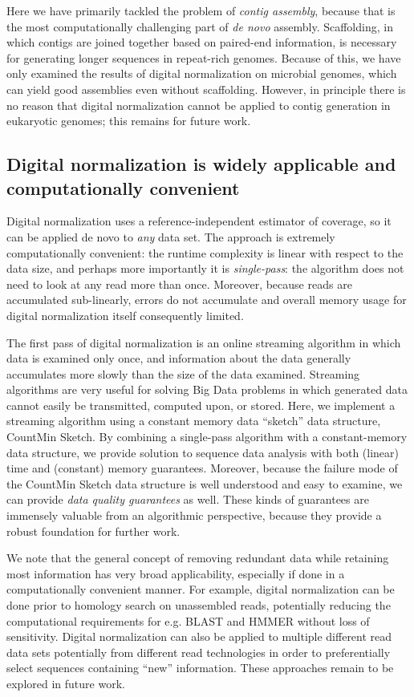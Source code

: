 \documentclass[10pt]{article}
\begin{document}
Here we have primarily tackled the problem of {\em contig assembly},
because that is the most computationally challenging part of {\em de
  novo} assembly.  Scaffolding, in which contigs are joined together
based on paired-end information, is necessary for generating longer
sequences in repeat-rich genomes.  Because of this, we have only
examined the results of digital normalization on microbial genomes,
which can yield good assemblies even without scaffolding.  However, in
principle there is no reason that digital normalization cannot be
applied to contig generation in eukaryotic genomes; this remains for
future work.

\subsection*{Digital normalization is widely applicable and computationally convenient}

Digital normalization uses a reference-independent estimator of
coverage, so it can be applied de novo to {\em any} data set.  The
approach is extremely computationally convenient: the runtime
complexity is linear with respect to the data size, and perhaps more
importantly it is {\em single-pass}: the algorithm does not need to
look at any read more than once.  Moreover, because reads are
accumulated sub-linearly, errors do not accumulate and overall memory
usage for digital normalization itself consequently limited.

The first pass of digital normalization is an online streaming
algorithm in which data is examined only once, and information about
the data generally accumulates more slowly than the size of the data
examined.  Streaming algorithms are very useful for solving Big Data
problems in which generated data cannot easily be transmitted,
computed upon, or stored.  Here, we implement a streaming algorithm
using a constant memory data ``sketch'' data structure, CountMin
Sketch.  By combining a single-pass algorithm with a constant-memory
data structure, we provide solution to sequence data analysis with
both (linear) time and (constant) memory guarantees. Moreover, because
the failure mode of the CountMin Sketch data structure is well
understood and easy to examine, we can provide {\em data quality
guarantees} as well.  These kinds of guarantees are immensely
valuable from an algorithmic perspective, because they provide a
robust foundation for further work.

We note that the general concept of removing redundant data while
retaining most information has very broad applicability, especially if
done in a computationally convenient manner.  For example, digital
normalization can be done prior to homology search on unassembled
reads, potentially reducing the computational requirements for
e.g. BLAST and HMMER without loss of sensitivity.  Digital
normalization can also be applied to multiple different read data sets
potentially from different read technologies in order to preferentially
select sequences containing ``new'' information.  These approaches
remain to be explored in future work.
\end{document}
